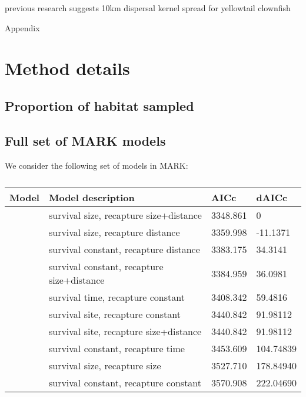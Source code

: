 \documentclass[12pt, oneside]{article}   	%
\begin{document}
previous research suggests 10km dispersal kernel spread for yellowtail clownfish \citep{pinsky2010using}

\newpage{}

{\LARGE Appendix}

\appendix

\renewcommand{\theequation}{A\arabic{equation}}
\renewcommand{\thetable}{A\arabic{table}}
\setcounter{equation}{0}  %
\setcounter{figure}{0}
\setcounter{table}{0}

\section{Method details}
\subsection*{Proportion of habitat sampled} \label{APP_SEC_ProbHabSampled}

\newpage{}

\subsection*{Full set of MARK models}
We consider the following set of models in MARK:
\begin{table}
\begin{centering}
\begin{tabular}{|p{2in}|p{2.5in}|p{0.75in}|p{0.75in}|}
\hline 
\textbf{Model} & \textbf{Model description} & \textbf{AICc} & \textbf{dAICc} \\ \hline
& survival size, recapture size+distance & 3348.861 & 0 \\ \hline
& survival size, recapture distance & 3359.998 & -11.1371 \\ \hline
& survival constant, recapture distance & 3383.175 & 34.3141 \\ \hline
& survival constant, recapture size+distance & 3384.959 & 36.0981 \\ \hline
& survival time, recapture constant & 3408.342 & 59.4816 \\ \hline
& survival site, recapture constant & 3440.842 & 91.98112 \\ \hline
& survival site, recapture size+distance & 3440.842 & 91.98112 \\ \hline
& survival constant, recapture time & 3453.609 & 104.74839 \\ \hline
& survival size, recapture size & 3527.710 & 178.84940 \\ \hline
& survival constant, recapture constant & 3570.908 & 222.04690 \\ \hline
\end{tabular}
\end{centering}
\caption{}\label{APP_TAB_MARKmodels}
\end{table}
\end{document}
